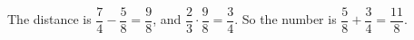 The distance is $\dfrac74-\dfrac58=\dfrac98$, and $\dfrac23\cdot\dfrac98=\dfrac34$. So the number is $\dfrac58+\dfrac34=\boxed{\dfrac{11}{8}}$.
